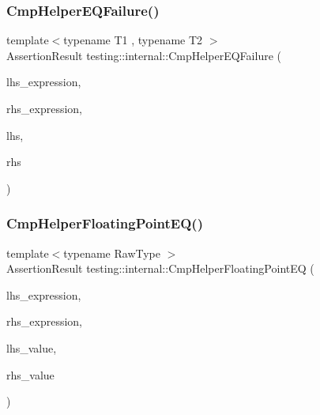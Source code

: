 \subsubsection{\texorpdfstring{CmpHelperEQFailure()}{CmpHelperEQFailure()}}
{\footnotesize\ttfamily template$<$typename T1 , typename T2 $>$ \\
Assertion\+Result testing\+::internal\+::\+Cmp\+Helper\+E\+Q\+Failure (\begin{DoxyParamCaption}\item[{const char $\ast$}]{lhs\+\_\+expression,  }\item[{const char $\ast$}]{rhs\+\_\+expression,  }\item[{const T1 \&}]{lhs,  }\item[{const T2 \&}]{rhs }\end{DoxyParamCaption})}

\mbox{\label{namespacetesting_1_1internal_a98ce463e5dbe0c6120fa817e1f8f2944}} 
\subsubsection{\texorpdfstring{CmpHelperFloatingPointEQ()}{CmpHelperFloatingPointEQ()}}
{\footnotesize\ttfamily template$<$typename Raw\+Type $>$ \\
Assertion\+Result testing\+::internal\+::\+Cmp\+Helper\+Floating\+Point\+EQ (\begin{DoxyParamCaption}\item[{const char $\ast$}]{lhs\+\_\+expression,  }\item[{const char $\ast$}]{rhs\+\_\+expression,  }\item[{Raw\+Type}]{lhs\+\_\+value,  }\item[{Raw\+Type}]{rhs\+\_\+value }\end{DoxyParamCaption})}

\mbox{\label{namespacetesting_1_1internal_a894ffccd936d78fd555f490020c27f0a}} 
